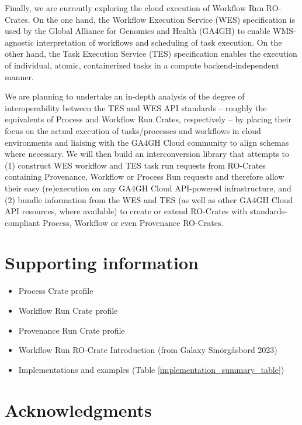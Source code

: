 \documentclass[10pt,letterpaper]{article}
\begin{document}
Finally, we are currently exploring the cloud execution of Workflow Run RO-Crates.
On the one hand, the Workflow Execution Service (WES) specification is used by the Global Alliance for Genomics and Health (GA4GH) \cite{Rehm 2021} to enable WMS-agnostic interpretation of workflows and scheduling of task execution. On the other hand, the Task Execution Service (TES) specification enables the execution of individual, atomic, containerized tasks in a compute backend-independent manner.

We are planning to undertake an in-depth analysis of the degree of interoperability between the TES and WES API standards -- roughly the equivalents of Process and Workflow Run Crates, respectively -- by placing their focus on the actual execution of tasks/processes and workflows in cloud environments and liaising with the GA4GH Cloud community to align schemas where necessary.
We will then build an interconversion library that attempts to (1) construct WES workflow and TES task run requests from RO-Crates containing Provenance, Workflow or Process Run requests and therefore allow their easy (re)execution on any GA4GH Cloud API-powered infrastructure, and (2) bundle information from the WES and TES (as well as other GA4GH Cloud API resources, where available) to create or extend RO-Crates with standards-compliant Process, Workflow or even Provenance RO-Crates.



\section*{Supporting information}

\begin{itemize}
    \item Process Crate profile \cite{WRROC 2023a}
    \item Workflow Run Crate profile \cite{WRROC 2023b}
    \item Provenance Run Crate profile \cite{WRROC 2023c}
    \item Workflow Run RO-Crate Introduction \cite{runcrate-intro} (from Galaxy Smörgåsbord 2023) 
    \item Implementations and examples (Table \ref{implementation_summary_table})
\end{itemize}


\section*{Acknowledgments}
\end{document}
